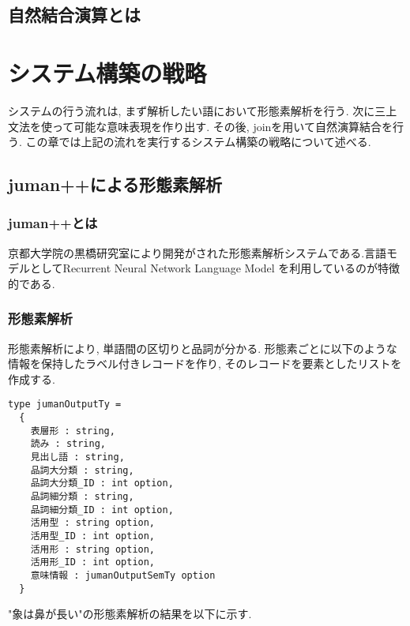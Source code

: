 \documentclass{jreport}
\begin{document}
\section{自然結合演算とは}


\section{}




\chapter{システム構築の戦略}
システムの行う流れは, まず解析したい語において形態素解析を行う. 次に三上文法を使って可能な意味表現を作り出す. 
その後, joinを用いて自然演算結合を行う.
この章では上記の流れを実行するシステム構築の戦略について述べる.
 
\section{juman++による形態素解析}
\subsection{juman++とは}
京都大学院の黒橋研究室により開発がされた形態素解析システムである.言語モデルとしてRecurrent Neural Network Language Model
を利用しているのが特徴的である.
\subsection{形態素解析}
形態素解析により, 単語間の区切りと品詞が分かる. 形態素ごとに以下のような情報を保持したラベル付きレコードを作り, 
そのレコードを要素としたリストを作成する.

\begin{verbatim}
type jumanOutputTy = 
  {
    表層形 : string, 
    読み : string,
    見出し語 : string,
    品詞大分類 : string,
    品詞大分類_ID : int option,
    品詞細分類 : string,
    品詞細分類_ID : int option, 
    活用型 : string option,
    活用型_ID : int option,
    活用形 : string option,
    活用形_ID : int option,
    意味情報 : jumanOutputSemTy option
  }
\end{verbatim}

"象は鼻が長い"の形態素解析の結果を以下に示す.
\end{document}
